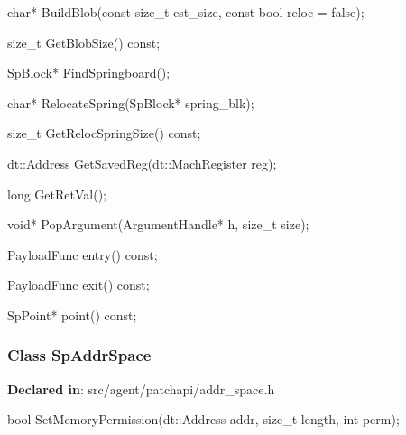 \begin{apient}
char* BuildBlob(const size_t est_size,
                const bool reloc = false);
\end{apient}
\apidesc{
}

\begin{apient}
size_t GetBlobSize() const;
\end{apient}
\apidesc{
}

\begin{apient}
SpBlock* FindSpringboard();
\end{apient}
\apidesc{
}

\begin{apient}
char* RelocateSpring(SpBlock* spring_blk);
\end{apient}
\apidesc{
}

\begin{apient}
size_t GetRelocSpringSize() const;
\end{apient}
\apidesc{
}

\begin{apient}
dt::Address GetSavedReg(dt::MachRegister reg);
\end{apient}
\apidesc{
}

\begin{apient}
long GetRetVal();
\end{apient}
\apidesc{
}

\begin{apient}
void* PopArgument(ArgumentHandle* h, size_t size);
\end{apient}
\apidesc{
}

\begin{apient}
PayloadFunc entry() const;
\end{apient}
\apidesc{
}

\begin{apient}
PayloadFunc exit() const;
\end{apient}
\apidesc{
}

\begin{apient}
SpPoint* point() const;
\end{apient}
\apidesc{
}


\subsubsection{Class SpAddrSpace}
\textbf{Declared in}: src/agent/patchapi/addr\_space.h

\begin{apient}
bool SetMemoryPermission(dt::Address addr,
                         size_t length,
                         int perm);
\end{apient}
\apidesc{
}

